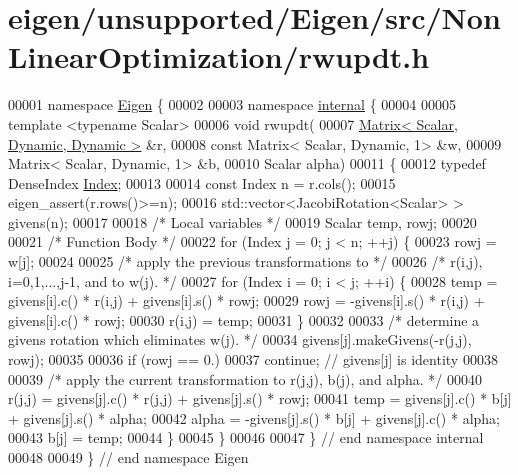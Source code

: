 \hypertarget{eigen_2unsupported_2_eigen_2src_2_non_linear_optimization_2rwupdt_8h_source}{}\section{eigen/unsupported/\+Eigen/src/\+Non\+Linear\+Optimization/rwupdt.h}
\label{eigen_2unsupported_2_eigen_2src_2_non_linear_optimization_2rwupdt_8h_source}

\begin{DoxyCode}
00001 \textcolor{keyword}{namespace }\hyperlink{namespace_eigen}{Eigen} \{ 
00002 
00003 \textcolor{keyword}{namespace }\hyperlink{namespaceinternal}{internal} \{
00004 
00005 \textcolor{keyword}{template} <\textcolor{keyword}{typename} Scalar>
00006 \textcolor{keywordtype}{void} rwupdt(
00007         \hyperlink{group___core___module}{Matrix< Scalar, Dynamic, Dynamic >}  &r,
00008         \textcolor{keyword}{const} Matrix< Scalar, Dynamic, 1>  &w,
00009         Matrix< Scalar, Dynamic, 1>  &b,
00010         Scalar alpha)
00011 \{
00012     \textcolor{keyword}{typedef} DenseIndex \hyperlink{namespace_eigen_a62e77e0933482dafde8fe197d9a2cfde}{Index};
00013 
00014     \textcolor{keyword}{const} Index n = r.cols();
00015     eigen\_assert(r.rows()>=n);
00016     std::vector<JacobiRotation<Scalar> > givens(n);
00017 
00018     \textcolor{comment}{/* Local variables */}
00019     Scalar temp, rowj;
00020 
00021     \textcolor{comment}{/* Function Body */}
00022     \textcolor{keywordflow}{for} (Index j = 0; j < n; ++j) \{
00023         rowj = w[j];
00024 
00025         \textcolor{comment}{/* apply the previous transformations to */}
00026         \textcolor{comment}{/* r(i,j), i=0,1,...,j-1, and to w(j). */}
00027         \textcolor{keywordflow}{for} (Index i = 0; i < j; ++i) \{
00028             temp = givens[i].c() * r(i,j) + givens[i].s() * rowj;
00029             rowj = -givens[i].s() * r(i,j) + givens[i].c() * rowj;
00030             r(i,j) = temp;
00031         \}
00032 
00033         \textcolor{comment}{/* determine a givens rotation which eliminates w(j). */}
00034         givens[j].makeGivens(-r(j,j), rowj);
00035 
00036         \textcolor{keywordflow}{if} (rowj == 0.)
00037             \textcolor{keywordflow}{continue}; \textcolor{comment}{// givens[j] is identity}
00038 
00039         \textcolor{comment}{/* apply the current transformation to r(j,j), b(j), and alpha. */}
00040         r(j,j) = givens[j].c() * r(j,j) + givens[j].s() * rowj;
00041         temp = givens[j].c() * b[j] + givens[j].s() * alpha;
00042         alpha = -givens[j].s() * b[j] + givens[j].c() * alpha;
00043         b[j] = temp;
00044     \}
00045 \}
00046 
00047 \} \textcolor{comment}{// end namespace internal}
00048 
00049 \} \textcolor{comment}{// end namespace Eigen}
\end{DoxyCode}
